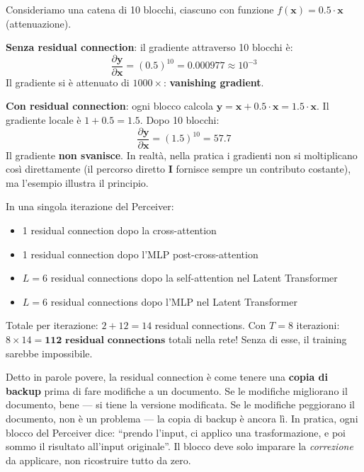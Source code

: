\documentclass[12pt,a4paper]{article}
\begin{document}
\begin{examplebox}
Consideriamo una catena di 10 blocchi, ciascuno con funzione $f(\mathbf{x}) = 0.5 \cdot \mathbf{x}$ (attenuazione).

\textbf{Senza residual connection}: il gradiente attraverso 10 blocchi \`e:
\[
    \frac{\partial \mathbf{y}}{\partial \mathbf{x}} = (0.5)^{10} = 0.000977 \approx 10^{-3}
\]
Il gradiente si \`e attenuato di $1000\times$: \textbf{vanishing gradient}.

\textbf{Con residual connection}: ogni blocco calcola $\mathbf{y} = \mathbf{x} + 0.5 \cdot \mathbf{x} = 1.5 \cdot \mathbf{x}$. Il gradiente locale \`e $1 + 0.5 = 1.5$. Dopo 10 blocchi:
\[
    \frac{\partial \mathbf{y}}{\partial \mathbf{x}} = (1.5)^{10} = 57.7
\]
Il gradiente \textbf{non svanisce}. In realt\`a, nella pratica i gradienti non si moltiplicano cos\`i direttamente (il percorso diretto $\mathbf{I}$ fornisce sempre un contributo costante), ma l'esempio illustra il principio.
\end{examplebox}

\begin{notabox}
In una singola iterazione del Perceiver:
\begin{itemize}
    \item 1 residual connection dopo la cross-attention
    \item 1 residual connection dopo l'MLP post-cross-attention
    \item $L = 6$ residual connections dopo la self-attention nel Latent Transformer
    \item $L = 6$ residual connections dopo l'MLP nel Latent Transformer
\end{itemize}
Totale per iterazione: $2 + 12 = 14$ residual connections.
Con $T = 8$ iterazioni: $8 \times 14 = \textbf{112 residual connections}$ totali nella rete!
Senza di esse, il training sarebbe impossibile.
\end{notabox}

\begin{notabox}
Detto in parole povere, la residual connection \`e come tenere una \textbf{copia di backup} prima di fare modifiche a un documento. Se le modifiche migliorano il documento, bene --- si tiene la versione modificata. Se le modifiche peggiorano il documento, non \`e un problema --- la copia di backup \`e ancora l\`i. In pratica, ogni blocco del Perceiver dice: ``prendo l'input, ci applico una trasformazione, e poi sommo il risultato all'input originale''. Il blocco deve solo imparare la \emph{correzione} da applicare, non ricostruire tutto da zero.
\end{notabox}
\end{document}
